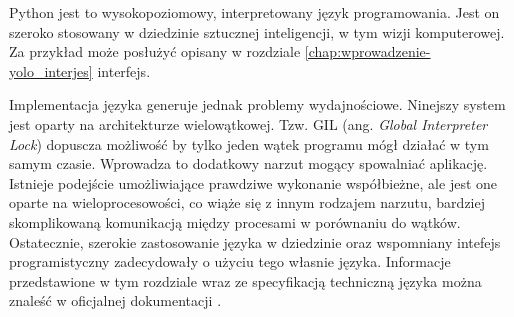 Python jest to wysokopoziomowy, interpretowany język programowania. Jest on szeroko stosowany w dziedzinie sztucznej inteligencji, w tym wizji komputerowej. Za przykład może posłużyć opisany w rozdziale \ref{chap:wprowadzenie-yolo_interjes} interfejs. 

Implementacja języka generuje jednak problemy wydajnościowe. Ninejszy system jest oparty na architekturze wielowątkowej. Tzw. GIL (ang. \emph{Global Interpreter Lock}) dopuscza możliwość by tylko jeden wątek programu mógł działać w tym samym czasie. Wprowadza to dodatkowy narzut mogący spowalniać aplikację. Istnieje podejście umożliwiające prawdziwe wykonanie współbieżne, ale jest one oparte na wieloprocesowości, co wiąże się z innym rodzajem narzutu, bardziej skomplikowaną komunikacją między procesami w porównaniu do wątków. Ostatecznie, szerokie zastosowanie języka w dziedzinie oraz wspomniany intefejs programistyczny zadecydowały o użyciu tego własnie języka. Informacje przedstawione w tym rozdziale wraz ze specyfikacją techniczną języka można znaleść w oficjalnej dokumentacji \cite{Python_docs}. 